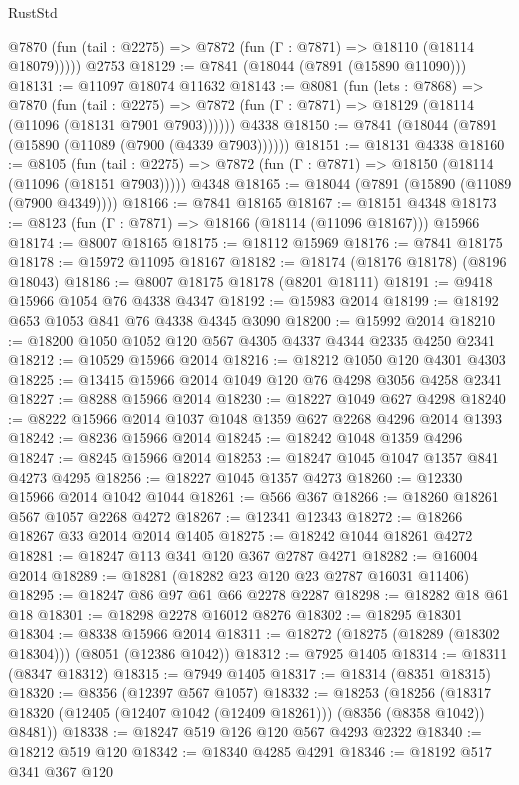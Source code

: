 \begin{lexlean}{RustStd}
\begin{coremodule}
{\begin{coremodule}
{{{{{{{{{{{{{{{{{{{{{{{{{{{{{{{{{{{{{{{{{{{{{{{{{{{{{{      @7870 (fun (tail : @2275) => @7872 (fun (Γ : @7871) => @18110 (@18114 @18079)))))
    @2753
@18129 := @7841 (@18044 (@7891 (@15890 @11090)))
@18131 := @11097 @18074 @11632
@18143 := @8081
    (fun (lets : @7868) =>
    @7870
      (fun (tail : @2275) =>
      @7872 (fun (Γ : @7871) => @18129 (@18114 (@11096 (@18131 @7901 @7903))))))
    @4338
@18150 := @7841 (@18044 (@7891 (@15890 (@11089 (@7900 (@4339 @7903))))))
@18151 := @18131 @4338
@18160 := @8105
    (fun (tail : @2275) => @7872 (fun (Γ : @7871) => @18150 (@18114 (@11096 (@18151 @7903)))))
    @4348
@18165 := @18044 (@7891 (@15890 (@11089 (@7900 @4349))))
@18166 := @7841 @18165
@18167 := @18151 @4348
@18173 := @8123 (fun (Γ : @7871) => @18166 (@18114 (@11096 @18167))) @15966
@18174 := @8007 @18165
@18175 := @18112 @15969
@18176 := @7841 @18175
@18178 := @15972 @11095 @18167
@18182 := @18174 (@18176 @18178) (@8196 @18043)
@18186 := @8007 @18175 @18178 (@8201 @18111)
@18191 := @9418 @15966 @1054 @76 @4338 @4347
@18192 := @15983 @2014
@18199 := @18192 @653 @1053 @841 @76 @4338 @4345 @3090
@18200 := @15992 @2014
@18210 := @18200 @1050 @1052 @120 @567 @4305 @4337 @4344 @2335 @4250 @2341
@18212 := @10529 @15966 @2014
@18216 := @18212 @1050 @120 @4301 @4303
@18225 := @13415 @15966 @2014 @1049 @120 @76 @4298 @3056 @4258 @2341
@18227 := @8288 @15966 @2014
@18230 := @18227 @1049 @627 @4298
@18240 := @8222 @15966 @2014 @1037 @1048 @1359 @627 @2268 @4296 @2014 @1393
@18242 := @8236 @15966 @2014
@18245 := @18242 @1048 @1359 @4296
@18247 := @8245 @15966 @2014
@18253 := @18247 @1045 @1047 @1357 @841 @4273 @4295
@18256 := @18227 @1045 @1357 @4273
@18260 := @12330 @15966 @2014 @1042 @1044
@18261 := @566 @367
@18266 := @18260 @18261 @567 @1057 @2268 @4272
@18267 := @12341 @12343
@18272 := @18266 @18267 @33 @2014 @2014 @1405
@18275 := @18242 @1044 @18261 @4272
@18281 := @18247 @113 @341 @120 @367 @2787 @4271
@18282 := @16004 @2014
@18289 := @18281 (@18282 @23 @120 @23 @2787 @16031 @11406)
@18295 := @18247 @86 @97 @61 @66 @2278 @2287
@18298 := @18282 @18 @61 @18
@18301 := @18298 @2278 @16012 @8276
@18302 := @18295 @18301
@18304 := @8338 @15966 @2014
@18311 := @18272 (@18275 (@18289 (@18302 @18304))) (@8051 (@12386 @1042))
@18312 := @7925 @1405
@18314 := @18311 (@8347 @18312)
@18315 := @7949 @1405
@18317 := @18314 (@8351 @18315)
@18320 := @8356 (@12397 @567 @1057)
@18332 := @18253
    (@18256 (@18317 @18320 (@12405 (@12407 @1042 (@12409 @18261))) (@8356 (@8358 @1042)) @8481))
@18338 := @18247 @519 @126 @120 @567 @4293 @2322
@18340 := @18212 @519 @120
@18342 := @18340 @4285 @4291
@18346 := @18192 @517 @341 @367 @120
}}}}}}}}}}}}}}}}}}}}}}}}}}}}}}}}}}}}}}}}}}}}}}}}}}}}}}
\end{coremodule}}
\end{coremodule}
\end{lexlean}
